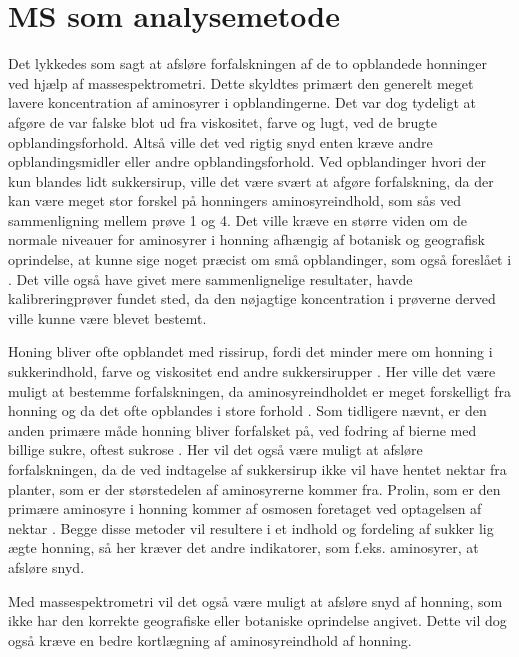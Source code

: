 \section{MS som analysemetode}
Det lykkedes som sagt at afsløre forfalskningen af de to opblandede honninger ved hjælp af massespektrometri.
Dette skyldtes primært den generelt meget lavere koncentration af aminosyrer i opblandingerne.
Det var dog tydeligt at afgøre de var falske blot ud fra viskositet, farve og lugt, ved de brugte opblandingsforhold.
Altså ville det ved rigtig snyd enten kræve andre opblandingsmidler eller andre opblandingsforhold.
Ved opblandinger hvori der kun blandes lidt sukkersirup, ville det være svært at afgøre forfalskning, da der kan være meget stor forskel på honningers aminosyreindhold, som sås ved sammenligning mellem prøve 1 og 4.
Det ville kræve en større viden om de normale niveauer for aminosyrer i honning afhængig af botanisk og geografisk oprindelse, at kunne sige noget præcist om små opblandinger, som også foreslået i \textcite{geohoney}.
Det ville også have givet mere sammenlignelige resultater, havde kalibreringprøver fundet sted, da den nøjagtige koncentration i prøverne derved ville kunne være blevet bestemt.
\par Honing bliver ofte opblandet med rissirup, fordi det minder mere om honning i sukkerindhold, farve og viskositet end andre sukkersirupper \parencite{BRShoney}.
Her ville det være muligt at bestemme forfalskningen, da aminosyreindholdet er meget forskelligt fra honning og da det ofte opblandes i store forhold \parencite{BRSaa}.
Som tidligere nævnt, er den anden primære måde honning bliver forfalsket på, ved fodring af bierne med billige sukre, oftest sukrose \parencite{adulterationhoney}.
Her vil det også være muligt at afsløre forfalskningen, da de ved indtagelse af sukkersirup ikke vil have hentet nektar fra planter, som er der størstedelen af aminosyrerne kommer fra.
Prolin, som er den primære aminosyre i honning kommer af osmosen foretaget ved optagelsen af nektar \parencite{prolineNectar}.
Begge disse metoder vil resultere i et indhold og fordeling af sukker lig ægte honning, så her kræver det andre indikatorer, som f.eks. aminosyrer, at afsløre snyd.
\par Med massespektrometri vil det også være muligt at afsløre snyd af honning, som ikke har den korrekte geografiske eller botaniske oprindelse angivet.
Dette vil dog også kræve en bedre kortlægning af aminosyreindhold af honning.
